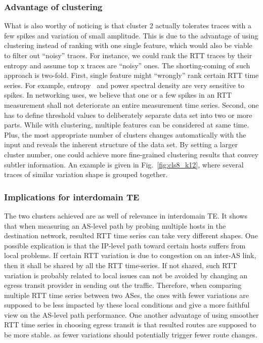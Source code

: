 \subsubsection{Advantage of clustering}
What is also worthy of noticing is that cluster 2 actually tolerates traces with a few spikes and variation of small amplitude. 
This is due to the advantage of using clustering instead of ranking with one single feature, which would also be viable to filter out ``noisy'' traces. 
For instance, we could rank the RTT traces by their entropy and assume top x traces are ``noisy'' ones. 
The shorting-coming of such approach is two-fold.
First, single feature might ``wrongly'' rank certain RTT time series. 
For example, entropy~\cite{Molina-Pico2011} and power spectral density are very sensitive to spikes. 
In networking uses, we believe that one or a few spikes in an RTT measurement shall not deteriorate an entire measurement time series. 
Second, one has to define threshold values to deliberately separate data set into two or more parts. 
While with clustering, multiple features can be considered at same time. 
Plus, the most appropriate number of clusters changes automatically with the input and reveals the inherent structure of the data set. 
By setting a larger cluster number, one could achieve more fine-grained clustering results that convey subtler information. An example is given in Fig.~\ref{fig:cls8_k12}, where several traces of similar variation shape is grouped together.

\subsubsection{Implications for interdomain TE}
The two clusters achieved are as well of relevance in interdomain TE. 
It shows that when measuring an AS-level path by probing multiple hosts in the destination network, resulted RTT time series can take very different shapes. 
One possible explication is that the IP-level path toward certain hosts suffers from local problems.
If certain RTT variation is due to congestion on an inter-AS link, then it shall be shared by all the RTT time-series. If not shared, such RTT variation is probably related to local issues can not be avoided by changing an egress transit provider in sending out the traffic.
Therefore, when comparing multiple RTT time series between two ASes, the ones with fewer variations are supposed to be less impacted by these local conditions and give a more faithful view on the AS-level path performance.
One another advantage of using smoother RTT time series in choosing egress transit is that resulted routes are supposed to be more stable. as fewer variations should potentially trigger fewer route changes. 

